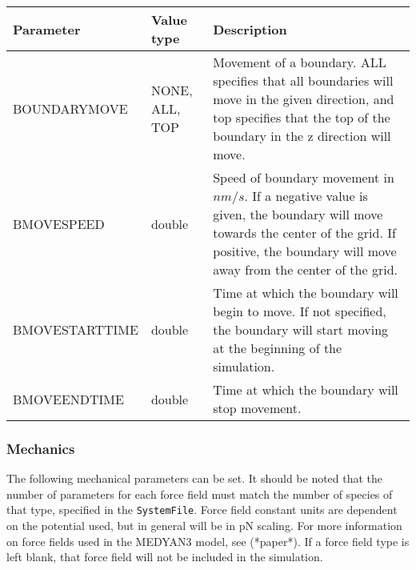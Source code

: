 \documentclass[11pt, oneside]{article}   	%
\begin{document}
\begin{table} [!ht]
\centering
\begin{tabular}{|L{5cm}|C{3cm}|L{5.2cm}|}  
\hline
 \textbf{Parameter} & \textbf{Value type} & \textbf{Description} \\
 \hline
  BOUNDARYMOVE & NONE, ALL, TOP & Movement of a boundary. ALL specifies that all boundaries will move in the given direction, and top specifies that the top of the boundary in the z direction will move. \\
  \hline
  BMOVESPEED & double & Speed of boundary movement in $nm / s$. If a negative value is given, the boundary will move towards the center of the grid. If positive, the boundary will move away from the center of the grid.\\
  \hline
   BMOVESTARTTIME & double & Time at which the boundary will begin to move. If not specified, the boundary will start moving at the beginning of the simulation.\\
  \hline
    BMOVEENDTIME & double &Time at which the boundary will stop movement.\\
  \hline
\end{tabular}
\end{table}

\subsubsection{Mechanics}

The following mechanical parameters can be set. It should be noted that the number of parameters for each force field must match the number of species of that type, specified in the \texttt{SystemFile}. Force field constant units are dependent on the potential used, but in general will be in pN scaling. For more information on force fields used in the MEDYAN3 model, see (*paper*). If a force field type is left blank, that force field will not be included in the simulation.
\end{document}
